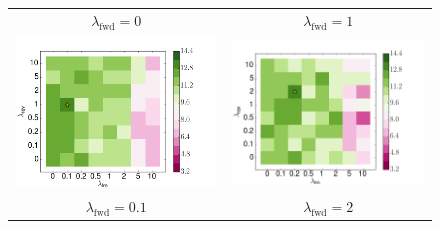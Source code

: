 \documentclass[11pt,a4paper]{article}
\begin{document}
\begin{figure}
\centering
\begin{tabular}{c c}
$\lambda_\text{fwd} = 0$ & $\lambda_\text{fwd} = 1$ \\
\includegraphics[scale=0.36]{wmt0.png} & \includegraphics[scale=0.36]{wmt1.png} \\
$\lambda_\text{fwd} = 0.1$ & $\lambda_\text{fwd} = 2$ \\

\end{tabular}
\end{figure}
\end{document}

